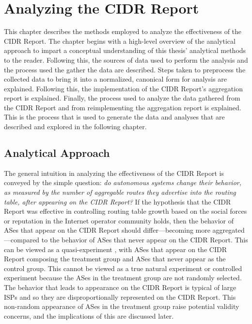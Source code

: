 \chapter{Analyzing the CIDR Report} %
\label{chap:method}

This chapter describes the methods employed to analyze the effectiveness of the CIDR Report. The chapter begins with a high-level overview of the analytical approach to impart a conceptual understanding of this thesis' analytical methods to the reader. Following this, the sources of data used to perform the analysis and the process used the gather the data are described. Steps taken to preprocess the collected data to bring it into a normalized, canonical form for analysis are explained. Following this, the implementation of the CIDR Report's aggregation report is explained. Finally, the process used to analyze the data gathered from the CIDR Report and from reimplementing the aggregation report is explained. This is the process that is used to generate the data and analyses that are described and explored in the following chapter.

\section{Analytical Approach}


The general intuition in analyzing the effectiveness of the CIDR Report is conveyed by the simple question: \emph{do autonomous systems change their behavior, as measured by the number of aggregable routes they advertise into the routing table, after appearing on the CIDR Report?} If the hypothesis that the CIDR Report was effective in controlling routing table growth based on the social forces or reputation in the Internet operator community holds, then the behavior of ASes that appear on the CIDR Report should differ---becoming more aggregated---compared to the behavior of ASes that never appear on the CIDR Report. This can be viewed as a quasi-experiment \cite{Babbie:2003uq}, with ASes that appear on the CIDR Report composing the treatment group and ASes that never appear as the control group. This cannot be viewed as a true natural experiment or controlled experiment because the ASes in the treatment group are not randomly selected. The behavior that leads to appearance on the CIDR Report is typical of large ISPs and so they are disproportionally represented on the CIDR Report. This non-random appearance of ASes in the treatment group raise potential validity concerns, and the implications of this are discussed later.

